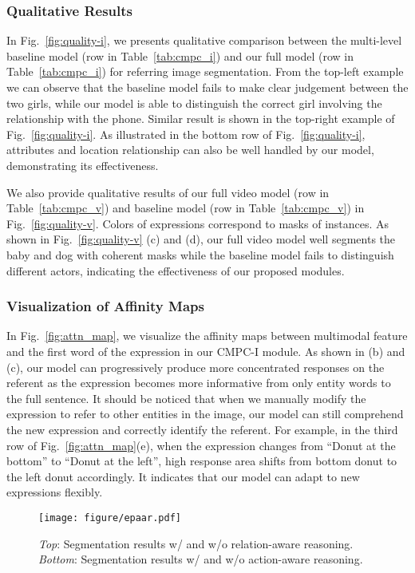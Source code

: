 \documentclass[10pt,journal,cspaper,compsoc]{IEEEtran}
\begin{document}
\subsubsection{Qualitative Results}
In Fig.~\ref{fig:quality-i}, we presents qualitative comparison between the multi-level baseline model (row  in Table~\ref{tab:cmpc_i}) and our full model (row  in Table~\ref{tab:cmpc_i}) for referring image segmentation. 
From the top-left example we can observe that the baseline model fails to make clear judgement between the two girls, while our model is able to distinguish the correct girl involving the relationship with the phone. 
Similar result is shown in the top-right example of Fig.~\ref{fig:quality-i}. 
As illustrated in the bottom row of Fig.~\ref{fig:quality-i}, attributes and location relationship can also be well handled by our model, demonstrating its effectiveness.

We also provide qualitative results of our full video model (row  in Table~\ref{tab:cmpc_v}) and baseline model (row  in Table~\ref{tab:cmpc_v}) in Fig.~\ref{fig:quality-v}. 
Colors of expressions correspond to masks of instances. 
As shown in Fig.~\ref{fig:quality-v} (c) and (d), our full video model well segments the baby and dog with coherent masks while the baseline model fails to distinguish different actors, indicating the effectiveness of our proposed modules.


\subsubsection{Visualization of Affinity Maps}
In Fig.~\ref{fig:attn_map}, we visualize the affinity maps between multimodal feature and the first word of the expression in our CMPC-I module. 
As shown in (b) and (c), our model can progressively produce more concentrated responses on the referent as the expression becomes more informative from only entity words to the full sentence. 
It should be noticed that when we manually modify the expression to refer to other entities in the image, our model can still comprehend the new expression and correctly identify the referent. 
For example, in the third row of Fig.~\ref{fig:attn_map}(e), when the expression changes from ``Donut at the bottom'' to ``Donut at the left'', high response area shifts from bottom donut to the left donut accordingly. 
It indicates that our model can adapt to new expressions flexibly.

\begin{figure}[htbp]
   \centering 
   \texttt{[image: figure/epaar.pdf]}
   \caption{\textit{Top}: Segmentation results w/ and w/o relation-aware reasoning.  \textit{Bottom}: Segmentation results w/ and w/o action-aware reasoning.}
   \label{fig:aar_rar}
\end{figure}
\end{document}
